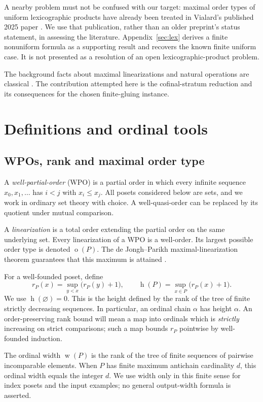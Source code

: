 \documentclass[11pt,a4paper]{article}
\theoremstyle{definition}
\theoremstyle{remark}
\newcommand{\ot}{\operatorname{o}}
\newcommand{\hgt}{\operatorname{h}}
\newcommand{\wid}{\operatorname{w}}
\begin{document}
A nearby problem must not be confused with our target: maximal order types
of uniform lexicographic products have already been treated in Vialard's
published 2025 paper \cite{Vialard2025}. We use that publication, rather
than an older preprint's status statement, in assessing the literature.
Appendix~\ref{sec:lex} derives a finite nonuniform formula as a supporting
result and recovers the known finite uniform case. It is not presented as
a resolution of an open lexicographic-product problem.

The background facts about maximal linearizations and natural operations
are classical \cite{deJonghParikh1977,DSS2020}. The contribution attempted
here is the cofinal-stratum reduction and its consequences for the chosen
finite-gluing instance.

\section{Definitions and ordinal tools}\label{sec:tools}

\subsection{WPOs, rank and maximal order type}

A \emph{well-partial-order} (WPO) is a partial order in which every infinite
sequence $x_0,x_1,\ldots$ has $i<j$ with $x_i\le x_j$. All posets considered
below are sets, and we work in ordinary set theory with choice. A
well-quasi-order can be replaced by its quotient under mutual comparison.

A \emph{linearization} is a total order extending the partial order on the
same underlying set. Every linearization of a WPO is a well-order. Its
largest possible order type is denoted $\ot(P)$. The de Jongh--Parikh
maximal-linearization theorem guarantees that this maximum is attained
\cite{deJonghParikh1977}.

For a well-founded poset, define
\[
 r_P(x)=\sup_{y<x}\bigl(r_P(y)+1\bigr),
 \qquad
 \hgt(P)=\sup_{x\in P}\bigl(r_P(x)+1\bigr).
\]
We use $\hgt(\varnothing)=0$. This is the height defined by the rank of the
tree of finite strictly decreasing sequences. In particular, an ordinal
chain $\alpha$ has height $\alpha$. An order-preserving rank bound will
mean a map into ordinals which is \emph{strictly} increasing on strict
comparisons; such a map bounds $r_P$ pointwise by well-founded induction.

The ordinal width $\wid(P)$ is the rank of the tree of finite sequences of
pairwise incomparable elements. When $P$ has finite maximum antichain
cardinality $d$, this ordinal width equals the integer $d$. We use width
only in this finite sense for index posets and the input examples; no
general output-width formula is asserted.
\end{document}
